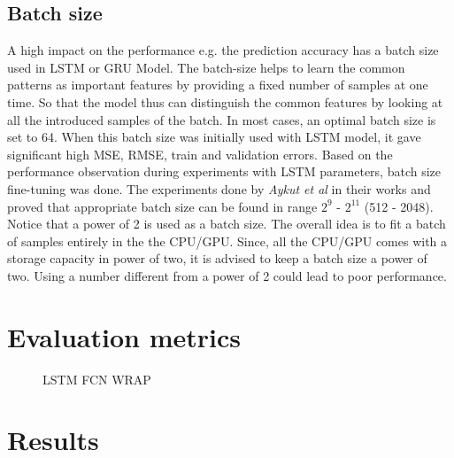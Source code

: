 \subsection{Batch size}
A high impact on the performance e.g. the prediction accuracy has a batch size used in LSTM or GRU Model. The batch-size helps to learn the common patterns as important features by providing a fixed number of samples at one time. So that the model thus can distinguish the common features by looking at all the introduced samples of the batch. In most cases, an optimal batch size is set to 64. When this batch size was initially used with LSTM model, it gave significant high MSE, RMSE, train and validation errors. Based on the performance observation during experiments with LSTM parameters, batch size fine-tuning was done. The experiments done by \textit{Aykut et al} in their works \cite{delay_compensation_360} and \cite{telepresence} proved that appropriate batch size can be found in range $2^{9}$ - $2^{11}$ (512 - 2048). Notice that a power of 2 is used as a batch size. The overall idea is to fit a batch of samples entirely in the the CPU/GPU. Since, all the CPU/GPU comes with a storage capacity in power of two, it is advised to keep a batch size a power of two. Using a number different from a power of 2 could lead to poor performance.




\section{Evaluation metrics}
\label{sec:imp:eval}


\begin{figure}
	\centering
	\caption{LSTM FCN WRAP}
	\label{fig:nn2}
\end{figure}


\section{Results}
\label{sec:imp:results}
